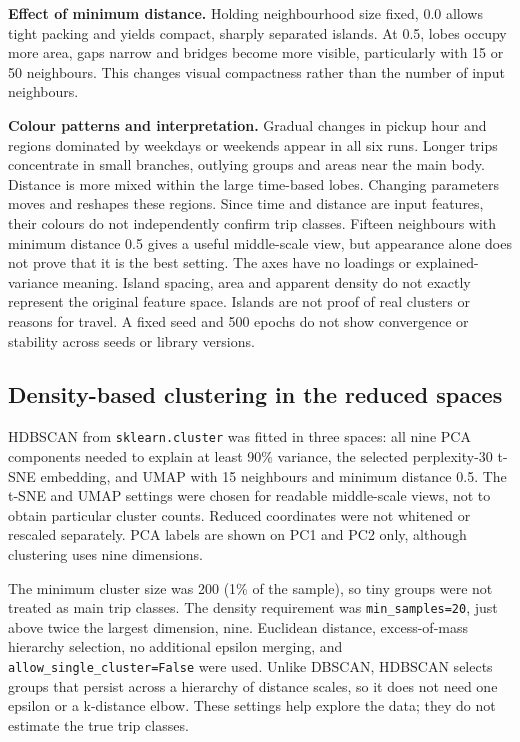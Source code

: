 \documentclass{article}
\begin{document}
\textbf{Effect of minimum distance.} Holding neighbourhood size fixed,
0.0 allows tight packing and yields compact, sharply separated islands.
At 0.5, lobes occupy more area, gaps narrow and bridges become more visible,
particularly with 15 or 50 neighbours. This changes visual compactness
rather than the number of input neighbours.

\textbf{Colour patterns and interpretation.} Gradual changes in pickup hour
and regions dominated by weekdays or weekends appear in all six runs.
Longer trips concentrate in small branches, outlying groups and areas
near the main body. Distance is more mixed within the large time-based lobes.
Changing parameters moves and reshapes these regions. Since time and distance
are input features, their colours do not independently confirm trip classes.
Fifteen neighbours with minimum distance 0.5 gives a useful middle-scale
view, but appearance alone does not prove that it is the best setting.
The axes have no loadings or explained-variance meaning. Island spacing,
area and apparent density do not exactly represent the original feature
space. Islands are not proof of real clusters or reasons for travel.
A fixed seed and 500 epochs do not show convergence or stability across
seeds or library versions.

\subsection{Density-based clustering in the reduced spaces}

HDBSCAN from \texttt{sklearn.cluster} was fitted in three spaces: all nine
PCA components needed to explain at least 90\% variance, the selected
perplexity-30 t-SNE embedding, and UMAP with 15 neighbours and minimum
distance 0.5. The t-SNE and UMAP settings were chosen for readable
middle-scale views, not to obtain particular cluster counts. Reduced
coordinates were not whitened or rescaled separately. PCA labels are shown on PC1
and PC2 only, although clustering uses nine dimensions.

The minimum cluster size was 200 (1\% of the sample), so tiny groups were
not treated as main trip classes. The density requirement was
\texttt{min\_samples=20}, just above twice the largest dimension, nine.
Euclidean distance, excess-of-mass hierarchy selection, no additional
epsilon merging, and \texttt{allow\_single\_cluster=False} were used.
Unlike DBSCAN, HDBSCAN selects groups that persist across a hierarchy of
distance scales, so it does not need one epsilon or a k-distance elbow.
These settings help explore the data; they do not estimate the true trip classes.
\end{document}
